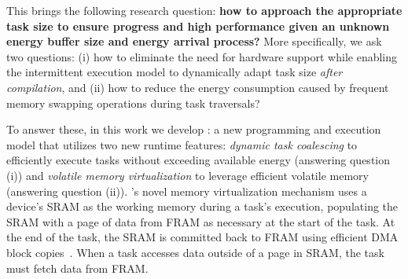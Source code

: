 This brings the following research question: {\bf how to approach the appropriate task size to ensure progress and high performance given an unknown energy buffer size and energy arrival process?} More specifically, we ask two questions: (i) how to eliminate the need for hardware support while enabling the intermittent execution model to dynamically adapt task size {\em after compilation}, and (ii) how to reduce the energy consumption caused by frequent memory swapping operations during task traversals?

To answer these, in this work we develop {\bf \sys}: a new programming and execution model that utilizes two new runtime features: {\em dynamic task coalescing} to efficiently execute tasks without exceeding available energy (answering question (i)) and  {\em volatile memory virtualization} to leverage efficient volatile memory (answering question (ii)). \sys's novel memory virtualization mechanism uses a device's SRAM as the working memory during a task's execution, populating the SRAM with a page of data from FRAM as necessary at the start of the task. At the end of the task, the SRAM is committed back to FRAM using efficient DMA block copies~\cite{kistler_micro_2006}. When a task accesses data outside of a page in SRAM, the task must fetch data from FRAM. 


